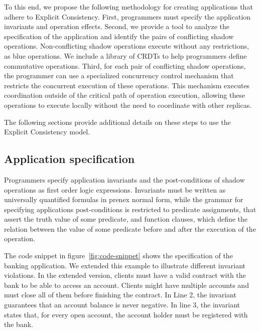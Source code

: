 \documentclass[11pt]{article}
\begin{document}
To this end, we propose the following methodology for creating applications
that adhere to Explicit Consistency.
First, programmers must specify the application invariants and operation effects.
Second, we provide a tool to analyze the specification of the application
and identify the pairs of conflicting shadow operations.
Non-conflicting shadow operations execute without any restrictions, as blue
operations. We include a library of CRDTs to help programmers define
commutative operations.
Third, for each pair of conflicting shadow operations,
the programmer can use a specialized concurrency control mechanism
that restricts the concurrent execution of these operations.
This mechanism executes coordination outside of the critical path of
operation execution, allowing these operations to execute locally
without the need to coordinate with other replicas.

The following sections provide additional details on these steps to
use the Explicit Consistency model.

\subsection{Application specification}
Programmers specify application invariants and the post-conditions
of shadow operations as
first order logic expressions.
Invariants must be written as universally quantified formulas in prenex normal
form, while the grammar for specifying applications post-conditions is
restricted to predicate assignments, that assert the truth value of some
predicate, and function clauses, which define the relation between the value of
some predicate before and after the execution of the operation.

The code snippet in figure~\ref{fig:code-snippet} shows the specification of the
banking application.
We extended this example to illustrate different invariant violations.
In the extended version, clients must have a valid contract with the bank to
be able to access an account.
Clients might have multiple accounts and must close all of them before finishing the contract.
In Line 2, the invariant guarantees that an account balance is never negative.
In line 3, the invariant states that, for every open account, the account holder must be registered with the bank.
\end{document}
